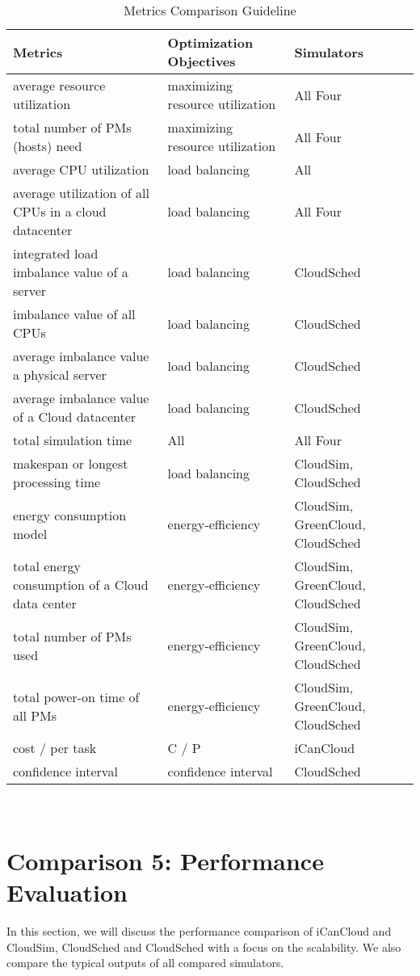 \documentclass[3p, twocolumn]{elsarticle}
\begin{document}
\begin{table*}
\scriptsize
\caption{Metrics Comparison Guideline}
\begin{center}
\begin{tabular}{l|l|l}
\hline Metrics &Optimization Objectives &Simulators
\\\hline
\hline average resource utilization & maximizing resource utilization & All Four \\
\hline total number of PMs (hosts) need & maximizing resource utilization & All Four \\
\hline average CPU utilization & load balancing & All \\
\hline average utilization of all CPUs in a cloud datacenter & load balancing & All Four\\
\hline integrated load imbalance value of a server & load balancing & CloudSched\\
\hline imbalance value of all CPUs & load balancing &  CloudSched\\
\hline average imbalance value a physical server  & load balancing & CloudSched \\
\hline average imbalance value of a Cloud datacenter & load balancing & CloudSched\\
\hline total simulation time &All & All Four\\
\hline makespan or longest processing time & load balancing& CloudSim, CloudSched\\
\hline energy consumption model& energy-efficiency& CloudSim, GreenCloud, CloudSched\\
\hline total energy consumption of a Cloud data center & energy-efficiency & CloudSim, GreenCloud, CloudSched\\
\hline total number of PMs used	& energy-efficiency& CloudSim, GreenCloud, CloudSched\\
\hline total power-on time of all PMs & energy-efficiency & CloudSim, GreenCloud, CloudSched\\
\hline cost / per task & C / P	& iCanCloud\\
\hline confidence interval & confidence interval & CloudSched\\
\hline
\end{tabular} \\
\end{center}
\end{table*}



\section{Comparison 5: Performance Evaluation}
In this section, we will discuss the performance comparison of iCanCloud and CloudSim, CloudSched and CloudSched with a focus on the scalability. We also compare the typical outputs of all compared simulators.
\end{document}
